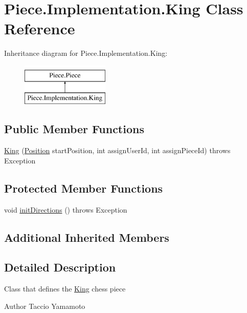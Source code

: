 \hypertarget{classPiece_1_1Implementation_1_1King}{\section{Piece.\-Implementation.\-King Class Reference}
\label{classPiece_1_1Implementation_1_1King}
}
Inheritance diagram for Piece.\-Implementation.\-King\-:\begin{figure}[H]
\begin{center}
\leavevmode
\includegraphics[height=2.000000cm]{classPiece_1_1Implementation_1_1King}
\end{center}
\end{figure}
\subsection*{Public Member Functions}
\begin{DoxyCompactItemize}
\item 
\hyperlink{classPiece_1_1Implementation_1_1King_a644208ee48f86c9da6fc27959fb3ef2a}{King} (\hyperlink{classUtil_1_1Position}{Position} start\-Position, int assign\-User\-Id, int assign\-Piece\-Id)  throws Exception 
\end{DoxyCompactItemize}
\subsection*{Protected Member Functions}
\begin{DoxyCompactItemize}
\item 
void \hyperlink{classPiece_1_1Implementation_1_1King_a3c191fbeb257c92630fb48813677b9c8}{init\-Directions} ()  throws Exception 
\end{DoxyCompactItemize}
\subsection*{Additional Inherited Members}


\subsection{Detailed Description}
Class that defines the \hyperlink{classPiece_1_1Implementation_1_1King}{King} chess piece \begin{DoxyAuthor}{Author}
Taccio Yamamoto 
\end{DoxyAuthor}


